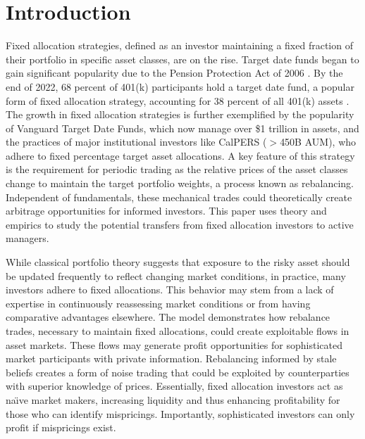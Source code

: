 \documentclass[12pt]{article}
\begin{document}
\doublespacing
\pagebreak

\section{Introduction}
\par Fixed allocation strategies, defined as an investor maintaining a fixed fraction of their portfolio in specific asset classes, are on the rise. Target date funds began to gain significant popularity due to the Pension Protection Act of 2006 \citep{vanguard20years}. By the end of 2022, 68 percent of 401(k) participants hold a target date fund, a popular form of fixed allocation strategy, accounting for 38 percent of all 401(k) assets \citep{ICIFactbook2024}. The growth in fixed allocation strategies is further exemplified by the popularity of Vanguard Target Date Funds, which now manage over \$1 trillion in assets, and the practices of major institutional investors like CalPERS ($>$450B AUM), who adhere to fixed percentage target asset allocations. A key feature of this strategy is the requirement for periodic trading as the relative prices of the asset classes change to maintain the target portfolio weights, a process known as rebalancing. Independent of fundamentals, these mechanical trades could theoretically create arbitrage opportunities for informed investors. This paper uses theory and empirics to study the potential transfers from fixed allocation investors to active managers. 

\par While classical portfolio theory suggests that exposure to the risky asset should be updated frequently to reflect changing market conditions, in practice, many investors adhere to fixed allocations. This behavior may stem from a lack of expertise in continuously reassessing market conditions or from having comparative advantages elsewhere. The model demonstrates how rebalance trades, necessary to maintain fixed allocations, could create exploitable flows in asset markets. These flows may generate profit opportunities for sophisticated market participants with private information. Rebalancing informed by stale beliefs creates a form of noise trading that could be exploited by counterparties with superior knowledge of prices. Essentially, fixed allocation investors act as na\"{\i}ve market makers, increasing liquidity and thus enhancing profitability for those who can identify mispricings. Importantly, sophisticated investors can only profit if mispricings exist.
\end{document}
